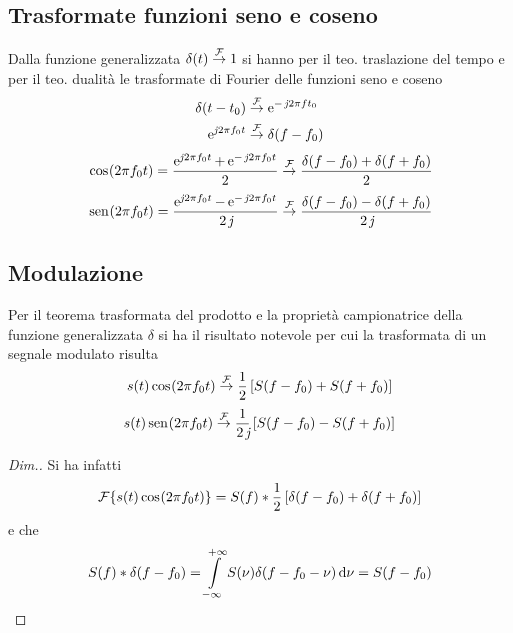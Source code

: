 \subsection{Trasformate funzioni seno e coseno}
Dalla funzione generalizzata $\delta(t)\overset{\operatorname{\mathcal{F}}}{\rightarrow}1$ si hanno per il teo. traslazione del tempo e per il teo. dualità le trasformate di Fourier delle funzioni seno e coseno
\[\begin{split}\delta(t-t_0)&\overset{\operatorname{\mathcal{F}}}{\to}\operatorname{e}^{-\operatorname{\mathit{j}\!} 2\pi f t_0}\\
\operatorname{e}^{\operatorname{\mathit{j}\!} 2\pi f_0 t}&\overset{\operatorname{\mathcal{F}}}{\to}\delta(f-f_0)\end{split}\]
\begin{equation}
\,{\operatorname{cos}}^{}\!\left({2\pi f_0 t}\right)=\frac{\operatorname{e}^{\operatorname{\mathit{j}\!} 2\pi f_0 t}+\operatorname{e}^{-\operatorname{\mathit{j}\!} 2\pi f_0 t}}{2}\overset{\operatorname{\mathcal{F}}}{\to}\frac{\delta(f-f_0)+\delta(f+f_0)}{2}\end{equation}
\begin{equation}\,{\operatorname{sen}}^{}\!\left({2\pi f_0 t}\right)=\frac{\operatorname{e}^{\operatorname{\mathit{j}\!} 2\pi f_0 t}-\operatorname{e}^{-\operatorname{\mathit{j}\!} 2\pi f_0 t}}{2\operatorname{\mathit{j}\!}}\overset{\operatorname{\mathcal{F}}}{\to}\frac{\delta(f-f_0)-\delta(f+f_0)}{2\operatorname{\mathit{j}\!}}\end{equation}

\subsection{Modulazione}
Per il teorema trasformata del prodotto e la proprietà campionatrice della funzione generalizzata $\delta$ si ha il risultato notevole per cui la trasformata di un segnale modulato risulta
\begin{equation}\label{eq:fourier_modulazione_coseno}
s(t) \,{\operatorname{cos}}^{}\!\left({2\pi f_0 t}\right)\overset{\operatorname{\mathcal{F}}}{\to}\frac{1}{2}\left[S(f-f_0)+S(f+f_0)\right]
\end{equation}
\begin{equation}
s(t) \,{\operatorname{sen}}^{}\!\left({2\pi f_0 t}\right)\overset{\operatorname{\mathcal{F}}}{\to}\frac{1}{2\operatorname{\mathit{j}\!}}\left[S(f-f_0)-S(f+f_0)\right]
\end{equation}

\begin{proof}[Dim.]
Si ha infatti \[\operatorname{\mathcal{F}}\!\left\lbrace{s(t)\,{\operatorname{cos}}^{}\!\left({2\pi f_0 t}\right)}\right\rbrace=S(f)\ast\frac{1}{2}\left[\delta(f-f_0)+\delta(f+f_0)\right]\] e che \[S(f)\ast\delta(f-f_0)=\int\limits_{-\infty}^{+\infty}{S(\nu)\delta(f-f_0-\nu)}{\,\mathop{}\!\mathrm{d}{\nu}}=S(f-f_0)\]
\end{proof}

